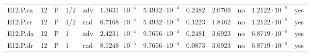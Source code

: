 {\begin{longtable}{@{}lllllllllll l@{}}
E12.P.ca & 12 & P & 1/2 & adv & $1.3631\cdot 10^{-4}$ & $5.4932\cdot 10^{-4}$ & 0.2482 & 2.0769 & no & $1.2122\cdot 10^{-2}$ & yes \\
E12.P.cr & 12 & P & 1/2 & rnd & $6.7168\cdot 10^{-5}$ & $5.4932\cdot 10^{-4}$ & 0.1223 & 1.8462 & no & $1.2122\cdot 10^{-2}$ & yes \\
E12.P.da & 12 & P & 1 & adv & $2.4231\cdot 10^{-4}$ & $9.7656\cdot 10^{-4}$ & 0.2481 & 3.6923 & no & $6.8719\cdot 10^{-2}$ & yes \\
E12.P.dr & 12 & P & 1 & rnd & $8.5248\cdot 10^{-5}$ & $9.7656\cdot 10^{-4}$ & 0.0873 & 3.6923 & no & $6.8719\cdot 10^{-2}$ & yes \\
\end{longtable}}
